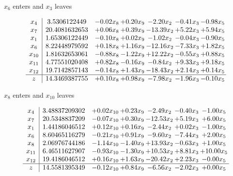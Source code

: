 \documentclass[8pt]{article}
\begin{document}
 $ x_{6} $ enters and $ x_{3} $ leaves 

 \[\begin{array}{c| c c@{\hskip 2pt} c@{\hskip 2pt} c@{\hskip 2pt} c@{\hskip 2pt} c@{\hskip 2pt} }
 x_{4}   &  3.5306122449 & -0.02 x_{8} & +  0.20 x_{9} & -2.20 x_{2} & -0.41 x_{3} & -0.98 x_{5}\\
 x_{7}   &  20.4081632653 & +  0.06 x_{8} & +  0.39 x_{9} & -13.39 x_{2} & +  5.22 x_{3} & +  5.94 x_{5}\\
 x_{1}   &  1.65306122449 & -0.10 x_{8} & +  0.02 x_{9} & -1.02 x_{2} & -0.04 x_{3} & -0.90 x_{5}\\
 x_{6}   &  8.22448979592 & +  0.18 x_{8} & +  1.16 x_{9} & -12.16 x_{2} & -7.33 x_{3} & +  1.82 x_{5}\\
 x_{10}   &  1.81632653061 & -0.88 x_{8} & -1.22 x_{9} & + 12.22 x_{2} & -0.55 x_{3} & +  0.88 x_{5}\\
 x_{11}   &  4.77551020408 & +  0.82 x_{8} & -0.16 x_{9} & -0.84 x_{2} & +  9.33 x_{3} & +  9.18 x_{5}\\
 x_{12}   &  19.7142857143 & -0.14 x_{8} & +  1.43 x_{9} & -18.43 x_{2} & +  2.14 x_{3} & +  0.14 x_{5}\\
\hline
z    &  14.3469387755 & +  0.10 x_{8} & +  0.98 x_{9} & -7.98 x_{2} & -1.96 x_{3} & -0.10 x_{5}\\
\end{array}\]


 $ x_{8} $ enters and $ x_{10} $ leaves 

 \[\begin{array}{c| c c@{\hskip 2pt} c@{\hskip 2pt} c@{\hskip 2pt} c@{\hskip 2pt} c@{\hskip 2pt} }
 x_{4}   &  3.48837209302 & +  0.02 x_{10} & +  0.23 x_{9} & -2.49 x_{2} & -0.40 x_{3} & -1.00 x_{5}\\
 x_{7}   &  20.5348837209 & -0.07 x_{10} & +  0.30 x_{9} & -12.53 x_{2} & +  5.19 x_{3} & +  6.00 x_{5}\\
 x_{1}   &  1.44186046512 & +  0.12 x_{10} & +  0.16 x_{9} & -2.44 x_{2} & +  0.02 x_{3} & -1.00 x_{5}\\
 x_{6}   &  8.60465116279 & -0.21 x_{10} & +  0.91 x_{9} & -9.60 x_{2} & -7.44 x_{3} & +  2.00 x_{5}\\
 x_{8}   &  2.06976744186 & -1.14 x_{10} & -1.40 x_{9} & + 13.93 x_{2} & -0.63 x_{3} & +  1.00 x_{5}\\
 x_{11}   &  6.46511627907 & -0.93 x_{10} & -1.30 x_{9} & + 10.53 x_{2} & +  8.81 x_{3} & + 10.00 x_{5}\\
 x_{12}   &  19.4186046512 & +  0.16 x_{10} & +  1.63 x_{9} & -20.42 x_{2} & +  2.23 x_{3} & -0.00 x_{5}\\
\hline
z    &  14.5581395349 & -0.12 x_{10} & +  0.84 x_{9} & -6.56 x_{2} & -2.02 x_{3} & +  0.00 x_{5}\\
\end{array}\]
\end{document}
